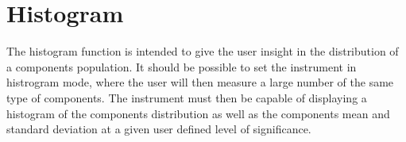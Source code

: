 \section{Histogram} \label{sec:5_2_Histogram}
The histogram function is intended to give the user insight in the distribution of a components population. It should be possible to set the instrument in histrogram mode, where the user will then measure a large number of the same type of components. The instrument must then be capable of displaying a histogram of the components distribution as well as the components mean and standard deviation at a given user defined level of significance.

